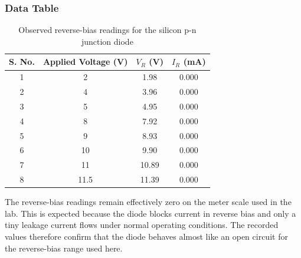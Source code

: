 \subsubsection*{Data Table}
\begin{table}[H]
  \centering
  \small
  \caption{Observed reverse-bias readings for the silicon p-n junction diode}
  \label{tab:lab2_reverse_observation}
  \renewcommand{\arraystretch}{1.15}
  \setlength{\tabcolsep}{6pt}
  \begin{tabular}{|c|c|c|c|}
    \hline
    \textbf{S. No.} & \textbf{Applied Voltage (V)} & \textbf{$V_R$ (V)} & \textbf{$I_R$ (mA)} \\
    \hline
    1               & 2                            & 1.98               & 0.000               \\
    \hline
    2               & 4                            & 3.96               & 0.000               \\
    \hline
    3               & 5                            & 4.95               & 0.000               \\
    \hline
    4               & 8                            & 7.92               & 0.000               \\
    \hline
    5               & 9                            & 8.93               & 0.000               \\
    \hline
    6               & 10                           & 9.90               & 0.000               \\
    \hline
    7               & 11                           & 10.89              & 0.000               \\
    \hline
    8               & 11.5                         & 11.39              & 0.000               \\
    \hline
  \end{tabular}
\end{table}

The reverse-bias readings remain effectively zero on the meter scale used in the lab.
This is expected because the diode blocks current in reverse bias and only a tiny leakage
current flows under normal operating conditions. The recorded values therefore confirm
that the diode behaves almost like an open circuit for the reverse-bias range used here.

